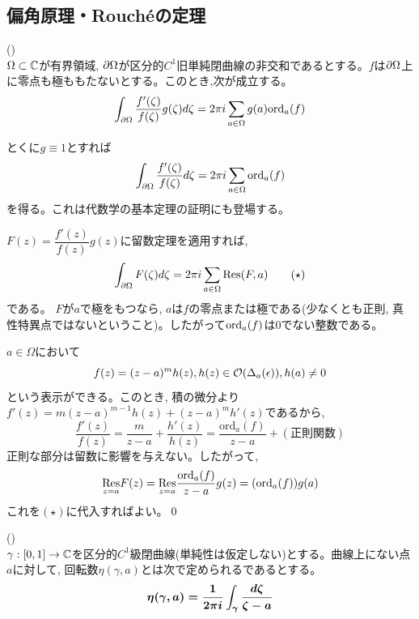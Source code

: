 \subsection{偏角原理・Rouch\'{e}の定理}
\besha
\begin{theo} () \label{theo:henkaku}\\
$\Omega \subset \mathbb{C}$が有界領域, $\partial \Omega$が区分的$C^1$旧単純閉曲線の非交和であるとする。$f$は$\partial \Omega$上に零点も極ももたないとする。このとき,次が成立する。
\[\displaystyle\int_{\partial\Omega}\dfrac{f'(\zeta)}{f(\zeta)}g(\zeta)d\zeta = 2\pi i\displaystyle\sum_{a\in\Omega}g(a)\mathrm{ord}_{a}(f)\]
\end{theo}
\ensha
\begin{rem}
とくに$g\equiv 1$とすれば
\[\displaystyle\int_{\partial \Omega}\dfrac{f'(\zeta)}{f(\zeta)}d\zeta =2\pi i\displaystyle\sum_{a\in\Omega} \mathrm{ord}_{a}(f)\]
を得る。これは代数学の基本定理の証明にも登場する。\bbox
\end{rem}
\prf
$F(z)=\dfrac{f'(z)}{f(z)}g(z)$に留数定理を適用すれば,
\[\displaystyle\int_{\partial\Omega}F(\zeta)d\zeta=2\pi i\displaystyle\sum_{a\in\Omega}\mbox{Res}(F,a)\qquad (\star)\]
である。
$F$が$a$で極をもつなら, $a$は$f$の零点または極である(少なくとも正則, 真性特異点ではないということ)。したがって$\mathrm{ord}_{a}(f)$は$0$でない整数である。\par
$a\in\Omega$において
\[f(z)=(z-a)^m h(z), h(z)\in\mathcal{O}(\Delta_{a}(\epsilon)), h(a)\neq 0\]
という表示ができる。このとき, 積の微分より$f'(z)=m(z-a)^{m-1}h(z)+(z-a)^mh'(z)$であるから,
\[\dfrac{f'(z)}{f(z)}=\dfrac{m}{z-a} +\dfrac{h'(z)}{h(z)}=\dfrac{\mbox{ord}_a(f)}{z-a}+(正則関数)\]
正則な部分は留数に影響を与えない。したがって,
\[\underset{z=a}{\mathrm{Res}}F(z) =\underset{z=a}{\mathrm{Res}}\dfrac{\mbox{ord}_a(f)}{z-a}g(z)=(\mathrm{ord}_{a}(f))g(a)\] これを$(\star)$に代入すればよい。\qed

\begin{defn} ()\\
$\gamma:[0,1]\to \mathbb{C}$を区分的$C^1$級閉曲線(単純性は仮定しない)とする。曲線上にない点$a$に対して, 回転数$\eta(\gamma, a)$とは次で定められるであるとする。
\[{\mbox{\boldmath $\eta(\gamma ,a)=\dfrac{1}{2\pi i}\displaystyle\int_{\gamma}\dfrac{d\zeta}{\zeta-a}$}}\]
\end{defn}

